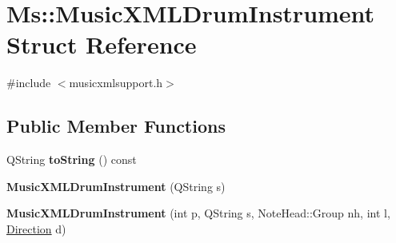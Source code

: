 \hypertarget{struct_ms_1_1_music_x_m_l_drum_instrument}{}\section{Ms\+:\+:Music\+X\+M\+L\+Drum\+Instrument Struct Reference}
\label{struct_ms_1_1_music_x_m_l_drum_instrument}


{\ttfamily \#include $<$musicxmlsupport.\+h$>$}

\subsection*{Public Member Functions}
\begin{DoxyCompactItemize}
\item 
\mbox{\label{struct_ms_1_1_music_x_m_l_drum_instrument_aadaa4c1661a67eaff88f84484ca59704}} 
Q\+String {\bfseries to\+String} () const
\item 
\mbox{\label{struct_ms_1_1_music_x_m_l_drum_instrument_a8f50feee2e661185c812766ee4aa1ad1}} 
{\bfseries Music\+X\+M\+L\+Drum\+Instrument} (Q\+String s)
\item 
\mbox{\label{struct_ms_1_1_music_x_m_l_drum_instrument_aae992aab6a9dc9ee81240306b59b80d8}} 
{\bfseries Music\+X\+M\+L\+Drum\+Instrument} (int p, Q\+String s, Note\+Head\+::\+Group nh, int l, \hyperlink{class_ms_1_1_direction}{Direction} d)
\end{DoxyCompactItemize}
